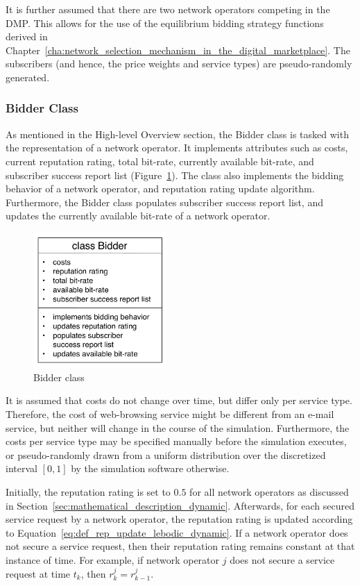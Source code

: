 It is further assumed that there are two network operators competing in the DMP. This allows for the use of the equilibrium bidding strategy functions derived in Chapter~\ref{cha:network_selection_mechanism_in_the_digital_marketplace}. The subscribers (and  hence, the price weights and service types) are pseudo-randomly generated.

\subsubsection{Bidder Class} %
\label{ssub:bidder_class_dynamic}
As mentioned in the High-level Overview section, the Bidder class is tasked with the representation of a network operator. It implements attributes such as costs, current reputation rating, total bit-rate, currently available bit-rate, and subscriber success report list (Figure~\ref{fig:bidder_class_dynamic}). The class also implements the bidding behavior of a network operator, and reputation rating update algorithm. Furthermore, the Bidder class populates subscriber success report list, and updates the currently available bit-rate of a network operator.

\begin{figure}[t]
	\includegraphics[width=2in]{3/Figures/bidder_class}
	\caption{Bidder class}
	\label{fig:bidder_class_dynamic}
\end{figure}

It is assumed that costs do not change over time, but differ only per service type. Therefore, the cost of web-browsing service might be different from an e-mail service, but neither will change in the course of the simulation. Furthermore, the costs per service type may be specified manually before the simulation executes, or pseudo-randomly drawn from a uniform distribution over the discretized interval $[0,1]$ by the simulation software otherwise.

Initially, the reputation rating is set to $0.5$ for all network operators as discussed in Section~\ref{sec:mathematical_description_dynamic}. Afterwards, for each secured service request by a network operator, the reputation rating is updated according to Equation~\eqref{eq:def_rep_update_lebodic_dynamic}. If a network operator does not secure a service request, then their reputation rating remains constant at that instance of time. For example, if network operator $j$ does not secure a service request at time $t_k$, then $r^j_k = r^j_{k-1}$.

